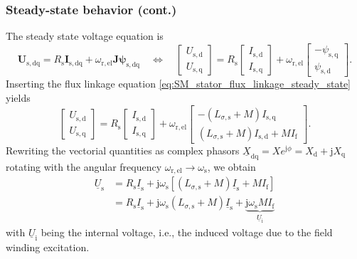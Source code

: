 \begin{frame}
	\frametitle{Steady-state behavior (cont.)}
	The steady state voltage equation is
	\begin{equation}
		\bm{U}_\mathrm{s,dq} = R_\mathrm{s} \bm{I}_\mathrm{s,dq}+ \omega_\mathrm{r,el}\bm{J}\bm{\psi}_\mathrm{s,dq} \quad \Leftrightarrow \quad \begin{bmatrix}
			U_\mathrm{s,d} \\ U_\mathrm{s,q}
		\end{bmatrix} = R_\mathrm{s} \begin{bmatrix}
			I_\mathrm{s,d} \\ I_\mathrm{s,q}
		\end{bmatrix} + \omega_\mathrm{r,el} \begin{bmatrix}
			-\psi_\mathrm{s,q} \\ \psi_\mathrm{s,d}
		\end{bmatrix}.
	\end{equation}
	Inserting the flux linkage equation \eqref{eq:SM_stator_flux_linkage_steady_state} yields
	\begin{equation}
		\begin{bmatrix}
			U_\mathrm{s,d} \\ U_\mathrm{s,q}
		\end{bmatrix} = R_\mathrm{s} \begin{bmatrix}
			I_\mathrm{s,d} \\ I_\mathrm{s,q}
		\end{bmatrix} + \omega_\mathrm{r,el} \begin{bmatrix}
			-\left(L_{\sigma,\mathrm{s}} + M\right)I_\mathrm{s,q} \\ \left(L_{\sigma,\mathrm{s}} + M\right)I_\mathrm{s,d} + M I_\mathrm{f}
		\end{bmatrix}.
	\end{equation}
	Rewriting the vectorial quantities as complex phasors $\underline{X}_\mathrm{dq} = X e^{\mathrm{j}\phi}=X_\mathrm{d} + \mathrm{j} X_\mathrm{q}$ rotating with the angular frequency $\omega_\mathrm{r,el} \rightarrow \omega_\mathrm{s}$, we obtain
	\begin{equation}
		\begin{split}
			\underline{U}_\mathrm{s} &= R_\mathrm{s} \underline{I}_\mathrm{s} + \mathrm{j}\omega_\mathrm{s} \left[\left(L_{\sigma,\mathrm{s}} + M\right)\underline{I}_\mathrm{s} + M I_\mathrm{f}\right]\\
			&= R_\mathrm{s} \underline{I}_\mathrm{s} + \mathrm{j}\omega_\mathrm{s} \left(L_{\sigma,\mathrm{s}} + M\right)\underline{I}_\mathrm{s} + \underbrace{\mathrm{j}\omega_\mathrm{s} M I_\mathrm{f}}_{\underline{U}_\mathrm{i}}
		\end{split}
		\label{eq:SM_voltage_steady_state}
	\end{equation}
	with $\underline{U}_\mathrm{i}$ being the internal voltage, i.e., the induced voltage due to the field winding excitation.
\end{frame}

